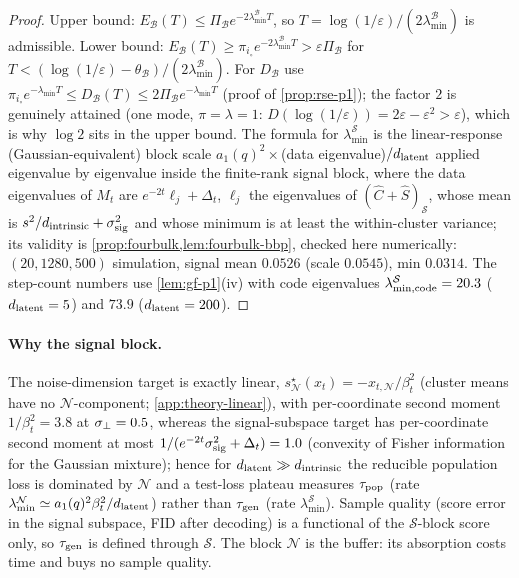 \begin{proof}
Upper bound: $E_{\mathcal B}(T)\le\Pi_{\mathcal B}e^{-2\lambda^{\mathcal B}_{\min}T}$, so $T=\log(1/\varepsilon)/(2\lambda^{\mathcal B}_{\min})$ is admissible. Lower bound: $E_{\mathcal B}(T)\ge\pi_{i_\circ}e^{-2\lambda^{\mathcal B}_{\min}T}>\varepsilon\Pi_{\mathcal B}$ for $T<(\log(1/\varepsilon)-\theta_{\mathcal B})/(2\lambda^{\mathcal B}_{\min})$. For $D_{\mathcal B}$ use $\pi_{i_\circ}e^{-\lambda_{\min}T}\le D_{\mathcal B}(T)\le2\Pi_{\mathcal B}e^{-\lambda_{\min}T}$ (proof of \cref{prop:rse-p1}); the factor $2$ is genuinely attained (one mode, $\pi=\lambda=1$: $D(\log(1/\varepsilon))=2\varepsilon-\varepsilon^2>\varepsilon$), which is why $\log2$ sits in the upper bound. The formula for $\lambda^{\mathcal S}_{\min}$ is the linear-response (Gaussian-equivalent) block scale $a_1(q)^2\times$(data eigenvalue)$/d_{\mathrm{latent}}$ applied eigenvalue by eigenvalue inside the finite-rank signal block, where the data eigenvalues of $M_t$ are $e^{-2t}\ell_j+\Delta_t$, $\ell_j$ the eigenvalues of $(\hat C+\hat S)_{\mathcal S}$, whose mean is $s^2/d_{\mathrm{intrinsic}}+\sigma_{\mathrm{sig}}^2$ and whose minimum is at least the within-cluster variance; its validity is \cref{prop:fourbulk,lem:fourbulk-bbp}, checked here numerically: $(20,1280,500)$ simulation, signal mean $0.0526$ (scale $0.0545$), min $0.0314$. The step-count numbers use \cref{lem:gf-p1}(iv) with code eigenvalues $\lambda^{\mathcal S}_{\min,\rm code}=20.3$ ($d_{\mathrm{latent}}=5$) and $73.9$ ($d_{\mathrm{latent}}=200$).
\end{proof}

\paragraph{Why the signal block.}
The noise-dimension target is exactly linear, $s^\star_{\mathcal N}(x_t)=-x_{t,\mathcal N}/\beta_t^2$ (cluster means have no $\mathcal N$-component; \cref{app:theory-linear}), with per-coordinate second moment $1/\beta_t^2=3.8$ at $\sigma_{\perp}=0.5$, whereas the signal-subspace target has per-coordinate second moment at most $1/(e^{-2t}\sigma_{\mathrm{sig}}^2+\Delta_t)=1.0$ (convexity of Fisher information for the Gaussian mixture); hence for $d_{\mathrm{latent}}\gg d_{\mathrm{intrinsic}}$ the reducible population loss is dominated by $\mathcal N$ and a test-loss plateau measures $\tau_{\rm pop}$ (rate $\lambda^{\mathcal N}_{\min}\simeq a_1(q)^2\beta_t^2/d_{\mathrm{latent}}$) rather than $\tau_{\mathrm{gen}}$ (rate $\lambda^{\mathcal S}_{\min}$). Sample quality (score error in the signal subspace, FID after decoding) is a functional of the $\mathcal S$-block score only, so $\tau_{\mathrm{gen}}$ is defined through $\mathcal S$. The block $\mathcal N$ is the buffer: its absorption costs time and buys no sample quality.

